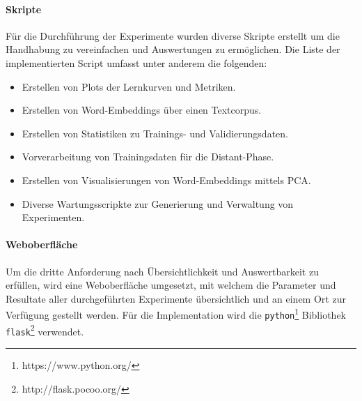 \paragraph{Skripte}
\label{technical_setup:scripts}
Für die Durchführung der Experimente wurden diverse Skripte erstellt um die Handhabung zu vereinfachen und Auswertungen zu ermöglichen. Die Liste der implementierten Script umfasst unter anderem die folgenden:

\begin{itemize}[noitemsep]
	\item Erstellen von Plots der Lernkurven und Metriken.
	\item Erstellen von Word-Embeddings über einen Textcorpus.
	\item Erstellen von Statistiken zu Trainings- und Validierungsdaten.
	\item Vorverarbeitung von Trainingsdaten für die Distant-Phase.
	\item Erstellen von Visualisierungen von Word-Embeddings mittels PCA.
	\item Diverse Wartungsscripkte zur Generierung und Verwaltung von Experimenten.
\end{itemize}

\paragraph{Weboberfläche}
\label{technical_setup:webgui}
Um die dritte Anforderung nach Übersichtlichkeit und Auswertbarkeit zu erfüllen, wird eine Weboberfläche umgesetzt, mit welchem die Parameter und Resultate aller durchgeführten Experimente übersichtlich und an einem Ort zur Verfügung gestellt werden. Für die Implementation wird die \texttt{python}\footnote{https://www.python.org/} Bibliothek \texttt{flask}\footnote{http://flask.pocoo.org/} verwendet.

